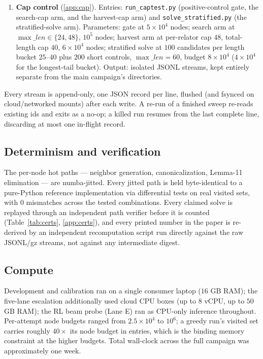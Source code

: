 \begin{enumerate}
    keyed by (form, word) for harvest and by candidate canonical key for merge/solve.
  \item \textbf{Cap control} (\ref{app:cap}). Entries: \texttt{run\_captest.py}
    (positive-control gate, the search-cap arm, and the harvest-cap arm) and
    \texttt{solve\_stratified.py} (the stratified-solve arm). Parameters: gate at
    $5\times10^4$ nodes; search arm at $\max\_len\in\{24,48\}$, $10^5$ nodes; harvest arm at
    per-relator cap $48$, total-length cap $40$, $6\times10^4$ nodes; stratified solve at
    $100$ candidates per length bucket $25$--$40$ plus $200$ short controls,
    $\max\_len=60$, budget $8\times10^4$ ($4\times10^4$ for the longest-tail bucket).
    Output: isolated JSONL streams, kept entirely separate from the main campaign's
    directories.
\end{enumerate}

Every stream is append-only, one JSON record per line, flushed (and fsynced on
cloud/networked mounts) after each write. A re-run of a finished sweep re-reads existing
ids and exits as a no-op; a killed run resumes from the last complete line, discarding at
most one in-flight record.

\subsection{Determinism and verification}

The per-node hot paths --- neighbor generation, canonicalization, Lemma-11 elimination --- are
numba-jitted. Every jitted path is held byte-identical to a pure-Python reference
implementation via differential tests on real visited sets, with $0$ mismatches across the
tested combinations. Every claimed solve is replayed through an independent path verifier
before it is counted (Table~\ref{tab:certs}, \ref{app:certs}), and every printed number in
the paper is re-derived by an independent recomputation script run directly against the raw
JSONL/gz streams, not against any intermediate digest.

\subsection{Compute}

Development and calibration ran on a single consumer laptop ($16$ GB RAM); the five-lane
escalation additionally used cloud CPU boxes (up to $8$ vCPU, up to $50$ GB RAM); the RL
beam probe (Lane E) ran as CPU-only inference throughout. Per-attempt node budgets ranged
from $2.5\times10^4$ to $10^6$; a greedy run's visited set carries roughly $40\times$ its
node budget in entries, which is the binding memory constraint at the higher budgets. Total
wall-clock across the full campaign was approximately one week.
